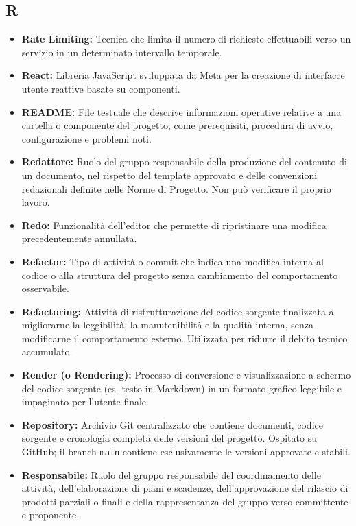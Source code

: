 {}
\subsection*{R}
\begin{itemize}[leftmargin=*]
      \item \textbf{Rate Limiting:} Tecnica che limita il numero di richieste effettuabili verso un servizio in un determinato intervallo temporale.
      \item \textbf{React:} Libreria JavaScript sviluppata da Meta per la creazione di interfacce utente reattive basate su componenti.
      \item \textbf{README:} File testuale che descrive informazioni operative relative
      a una cartella o componente del progetto, come prerequisiti, procedura di avvio,
      configurazione e problemi noti.
      \item \textbf{Redattore:} Ruolo del gruppo responsabile della produzione del
          contenuto di un documento, nel rispetto del template approvato e delle
          convenzioni redazionali definite nelle Norme di Progetto. Non può
          verificare il proprio lavoro.
      \item \textbf{Redo:} Funzionalità dell'editor che permette di ripristinare una modifica precedentemente annullata.      
      \item \textbf{Refactor:} Tipo di attività o commit che indica una modifica interna
      al codice o alla struttura del progetto senza cambiamento del comportamento
      osservabile.
      \item \textbf{Refactoring:} Attività di ristrutturazione del codice sorgente
      finalizzata a migliorarne la leggibilità, la manutenibilità e la qualità
      interna, senza modificarne il comportamento esterno. Utilizzata per ridurre
      il debito tecnico accumulato.
      \item \textbf{Render (o Rendering):} Processo di conversione e visualizzazione a schermo del codice sorgente (es. testo in Markdown) in un formato grafico leggibile e impaginato per l'utente finale.
      \item \textbf{Repository:} Archivio Git centralizzato che contiene documenti,
          codice sorgente e cronologia completa delle versioni del progetto.
          Ospitato su GitHub; il branch \texttt{main} contiene esclusivamente le
          versioni approvate e stabili.
      \item \textbf{Responsabile:} Ruolo del gruppo responsabile del coordinamento delle attività, dell'elaborazione di piani e scadenze, dell'approvazione del rilascio di prodotti parziali o finali e della rappresentanza del gruppo verso committente e proponente.

\end{itemize}
